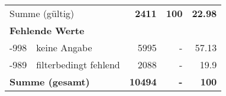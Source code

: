 \begin{longtable}{lXrrr}
     \midrule
     \multicolumn{2}{l}{Summe (gültig)} &
       \textbf{\num{2411}} &
     \textbf{\num{100}} &
       \textbf{\num[round-mode=places,round-precision=2]{22.98}} \\
     \multicolumn{5}{l}{\textbf{Fehlende Werte}}\\
       -998 &
       keine Angabe &
         \num{5995} &
        - &
         \num[round-mode=places,round-precision=2]{57.13} \\
       -989 &
       filterbedingt fehlend &
         \num{2088} &
        - &
         \num[round-mode=places,round-precision=2]{19.9} \\
     \midrule
     \multicolumn{2}{l}{\textbf{Summe (gesamt)}} &
          \textbf{\num{10494}} &
        \textbf{-} &
        \textbf{\num{100}} \\
     \bottomrule
     \end{longtable}
     
